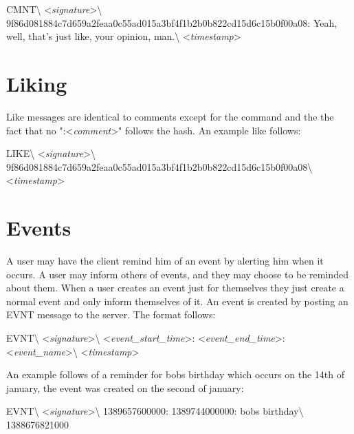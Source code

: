 \begin{center}
CMNT\textbackslash
\textless \textit{signature}\textgreater\textbackslash
9f86d081884c7d659a2feaa0c55ad015a3bf4f1b2b0b822cd15d6c15b0f00a08:
Yeah, well, that's just like, your opinion, man.\textbackslash
\textless \textit{timestamp}\textgreater
\end{center}

\section{Liking}
Like messages are identical to comments except for the command and the the fact
that no ":\textless \textit{comment}\textgreater" follows the hash. An example
like follows:

\begin{center}
LIKE\textbackslash
\textless \textit{signature}\textgreater\textbackslash
9f86d081884c7d659a2feaa0c55ad015a3bf4f1b2b0b822cd15d6c15b0f00a08\textbackslash
\textless \textit{timestamp}\textgreater
\end{center}

\section{Events}
A user may have the client remind him of an event by alerting him when it
occurs. A user may inform others of events, and they may choose to be reminded
about them. When a user creates an event just for themselves they just create a
normal event and only inform themselves of it. An event is created by posting an
EVNT message to the server. The format follows:

\begin{center}
EVNT\textbackslash
\textless \textit{signature}\textgreater\textbackslash
\textless \textit{event\_start\_time}\textgreater:
\textless \textit{event\_end\_time}\textgreater:
\textless \textit{event\_name}\textgreater\textbackslash
\textless \textit{timestamp}\textgreater
\end{center}

An example follows of a reminder for bobs birthday which occurs on the 14th of
january, the event was created on the second of january:

\begin{center}
EVNT\textbackslash
\textless \textit{signature}\textgreater\textbackslash
1389657600000:
1389744000000:
bobs birthday\textbackslash
1388676821000
\end{center}
